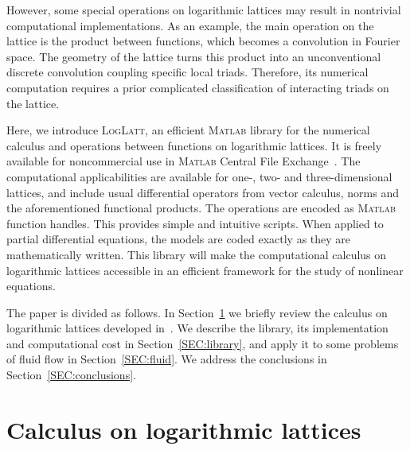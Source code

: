 \documentclass[12pt]{article}
\theoremstyle{definition}
\begin{document}
	However, some special operations on logarithmic lattices may result in nontrivial computational implementations.
	As an example, the main operation on the lattice is the product between functions, which becomes a convolution in Fourier space.
	The geometry of the lattice turns this product into an unconventional discrete convolution coupling specific local triads.
	Therefore, its numerical computation requires a prior complicated classification of interacting triads on the lattice.
	
	Here, we introduce \textsc{LogLatt}, an efficient \textsc{Matlab}\textsuperscript{\circledR} library for the numerical calculus and operations between functions on logarithmic lattices.
	It is freely available for noncommercial use in \textsc{Matlab} Central File Exchange~\cite{campolina2020loglattmatlab}.
	The computational applicabilities are available for one-, two- and three-dimensional lattices, and include usual differential operators from vector calculus, norms and the aforementioned functional products.
	The operations are encoded as \textsc{Matlab} function handles. This provides simple and intuitive scripts.
	When applied to partial differential equations, the models are coded exactly as they are mathematically written.
	This library will make the computational calculus on logarithmic lattices accessible in an efficient framework for the study of nonlinear equations.
	
	The paper is divided as follows.
	In Section~\ref{SEC:calculus_log} we briefly review the calculus on logarithmic lattices developed in~\cite{campolina2021fluid}.
	We describe the library, its implementation and computational cost in Section~\ref{SEC:library}, and apply it to some problems of fluid flow in Section~\ref{SEC:fluid}.
	We address the conclusions in Section~\ref{SEC:conclusions}.
	
	\section{Calculus on logarithmic lattices}\label{SEC:calculus_log}
	
\end{document}
